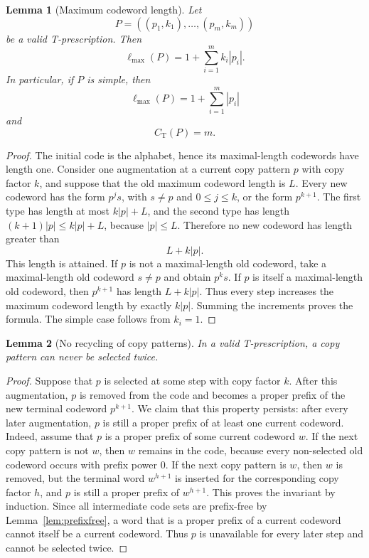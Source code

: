\documentclass[11pt]{article}
\newtheorem{lemma}{Lemma}
\newcommand{\CT}{C_{\mathrm T}}
\newcommand{\ellmax}{\ell_{\max}}
\begin{document}
\begin{lemma}[Maximum codeword length]
\label{lem:length}
Let
\begin{equation}
P=((p_1,k_1),\ldots,(p_m,k_m))
\end{equation}
be a valid T-prescription. Then
\begin{equation}
\ellmax(P)=1+\sum_{i=1}^{m}k_i|p_i|.
\end{equation}
In particular, if $P$ is simple, then
\begin{equation}
\ellmax(P)=1+\sum_{i=1}^{m}|p_i|
\end{equation}
and
\begin{equation}
\CT(P)=m.
\end{equation}
\end{lemma}

\begin{proof}
The initial code is the alphabet, hence its maximal-length codewords have length one. Consider one augmentation at a current copy pattern $p$ with copy factor $k$, and suppose that the old maximum codeword length is $L$. Every new codeword has the form $p^j s$, with $s\neq p$ and $0\leq j\leq k$, or the form $p^{k+1}$. The first type has length at most $k|p|+L$, and the second type has length $(k+1)|p|\leq k|p|+L$, because $|p|\leq L$. Therefore no new codeword has length greater than
\begin{equation}
L+k|p|.
\end{equation}
This length is attained. If $p$ is not a maximal-length old codeword, take a maximal-length old codeword $s\neq p$ and obtain $p^k s$. If $p$ is itself a maximal-length old codeword, then $p^{k+1}$ has length $L+k|p|$. Thus every step increases the maximum codeword length by exactly $k|p|$. Summing the increments proves the formula. The simple case follows from $k_i=1$.
\end{proof}

\begin{lemma}[No recycling of copy patterns]
\label{lem:norecycling}
In a valid T-prescription, a copy pattern can never be selected twice.
\end{lemma}

\begin{proof}
Suppose that $p$ is selected at some step with copy factor $k$. After this augmentation, $p$ is removed from the code and becomes a proper prefix of the new terminal codeword $p^{k+1}$.
We claim that this property persists: after every later augmentation, $p$ is still a proper prefix of at least one current codeword. Indeed, assume that $p$ is a proper prefix of some current codeword $w$. If the next copy pattern is not $w$, then $w$ remains in the code, because every non-selected old codeword occurs with prefix power $0$. If the next copy pattern is $w$, then $w$ is removed, but the terminal word $w^{h+1}$ is inserted for the corresponding copy factor $h$, and $p$ is still a proper prefix of $w^{h+1}$. This proves the invariant by induction.
Since all intermediate code sets are prefix-free by Lemma~\ref{lem:prefixfree}, a word that is a proper prefix of a current codeword cannot itself be a current codeword. Thus $p$ is unavailable for every later step and cannot be selected twice.
\end{proof}
\end{document}
